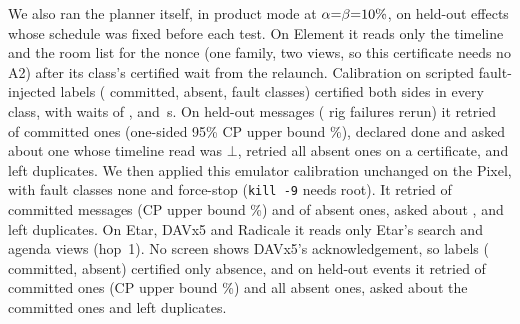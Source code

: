  We also ran the \alg planner itself, in product mode at $\alpha{=}\beta{=}10\%$, on held-out effects whose schedule was fixed before each test.
On Element it reads only the timeline and the room list for the nonce (one family, two views, so this certificate needs no A2) after its class's certified wait from the relaunch. Calibration on \RealElPlanCalN{} scripted
fault-injected labels (\RealElPlanCalOneN{} committed, \RealElPlanCalZeroN{} absent, \RealElPlanClassN{} fault classes) certified both sides in every class, with waits of \RealElPlanWaitNone,
\RealElPlanWaitKill{} and \RealElPlanWaitFs\,s. On \RealElPlanTestN{} held-out messages (\RealElPlanInvalidN{} rig failures rerun) it retried
\RealElPlanRetryCommitted{} of \RealElPlanCommittedN{} committed ones (one-sided 95\% CP upper bound \RealElPlanRetryHi\%), declared \RealElPlanDeclared{} done and asked about one whose timeline read was $\bot$,
retried all \RealElPlanRetryAbsent{} absent ones on a certificate, and left \RealElPlanDupN{} duplicates. We then applied this emulator calibration unchanged on the Pixel, with fault classes none and force-stop (\texttt{kill -9} needs root).
It retried \PixTRetryCom{} of \PixTCom{} committed messages (CP upper bound \PixTHi\%) and \PixTRetryAbs{} of \PixTAbs{} absent ones, asked about \PixTAsk, and left \PixTDup{} duplicates. On Etar, DAVx5 and Radicale it reads only Etar's search and agenda views (hop~1). No screen shows DAVx5's acknowledgement, so \RealPlanCalN{} labels (\RealPlanCalOneN{} committed, \RealPlanCalZeroN{} absent) certified only absence,
and on \RealPlanTestN{} held-out events it retried \RealPlanRetryCommitted{} of \RealPlanCommittedN{} committed ones (CP upper bound \RealPlanRetryHi\%) and all \RealPlanRetryAbsent{} absent ones, asked about the committed ones and left
\RealPlanDupN{} duplicates.
